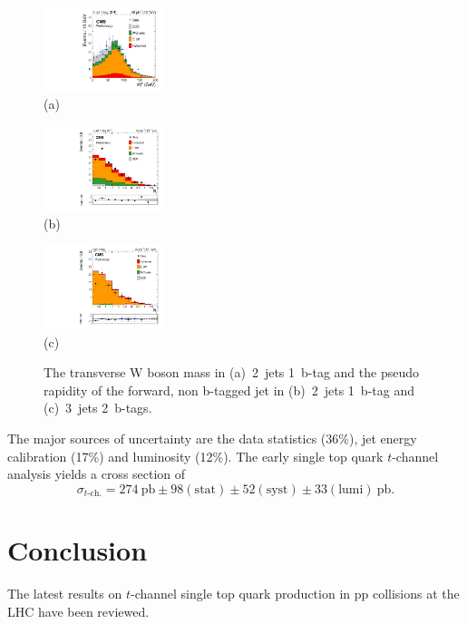 \documentclass{PoS}
\begin{document}
\begin{figure}[htbp]
\begin{center}
\parbox[t]{0.32\textwidth}{\centering\includegraphics[width=0.31\textwidth]{cms_xsec13/mtw.pdf}\\(a)}
\parbox[t]{0.32\textwidth}{\centering\includegraphics[width=0.31\textwidth]{cms_xsec13/mu2j1t.pdf}\\(b)}
\parbox[t]{0.32\textwidth}{\centering\includegraphics[width=0.31\textwidth]{cms_xsec13/mu3j2t.pdf}\\(c)}
\end{center}
\caption{\label{fig:singletop13}The transverse W boson mass in (a)~2~jets 1~b-tag and the pseudo rapidity of the forward, non b-tagged jet in (b)~2~jets 1~b-tag and (c)~3~jets 2~b-tags.}
\end{figure}

The major sources of uncertainty are the data statistics (36\%), jet energy calibration (17\%) and luminosity (12\%).
The early single top quark $t$-channel analysis yields a cross section of
\begin{equation}
\sigma_{t\mbox{-}\mathrm{ch.}}=274~\mathrm{pb}\pm98\mathrm{(stat)}\pm52\mathrm{(syst)}\pm33\mathrm{(lumi)}~\mathrm{pb}.
\end{equation}

\section{Conclusion}
The latest results on $t$-channel single top quark production in pp collisions at the LHC have been reviewed.
\end{document}
